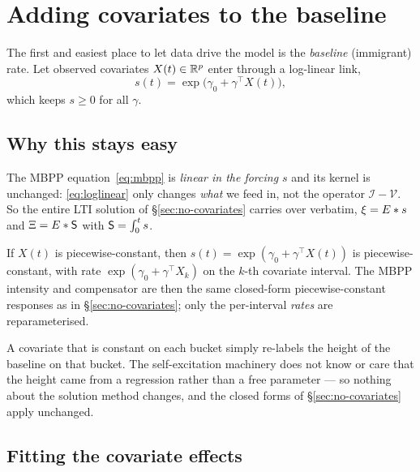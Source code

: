 \section{Adding covariates to the baseline}
\label{sec:baseline-cov}

The first and easiest place to let data drive the model is the \emph{baseline}
(immigrant) rate. Let observed covariates $X(t)\in\mathbb{R}^p$ enter through a log-linear
link,
\begin{equation}
s(t)=\exp\!\bigl(\gamma_0+\gamma^\top X(t)\bigr),
\label{eq:loglinear}
\end{equation}
which keeps $s\ge0$ for all $\gamma$.

\subsection{Why this stays easy}

The MBPP equation~\eqref{eq:mbpp} is \emph{linear in the forcing $s$} and its
kernel is unchanged: \eqref{eq:loglinear} only changes \emph{what} we feed in, not
the operator $\mathcal I-\mathcal V$. So the entire LTI solution of
\S\ref{sec:no-covariates} carries over verbatim, $\xi=E\ast s$ and
$\Xi=E\ast\mathsf{S}$ with $\mathsf{S}=\int_0^t s$.

\begin{proposition}
\label{prop:pc-cov}
If $X(t)$ is piecewise-constant, then $s(t)=\exp(\gamma_0+\gamma^\top X(t))$ is
piecewise-constant, with rate $\exp(\gamma_0+\gamma^\top X_k)$ on the $k$-th
covariate interval. The MBPP intensity and compensator are then the same
closed-form piecewise-constant responses as in \S\ref{sec:no-covariates}; only the
per-interval \emph{rates} are reparameterised.
\end{proposition}

\begin{intuition}
A covariate that is constant on each bucket simply re-labels the height of the
baseline on that bucket. The self-excitation machinery does not know or care that
the height came from a regression rather than a free parameter --- so nothing about
the solution method changes, and the closed forms of \S\ref{sec:no-covariates}
apply unchanged.
\end{intuition}

\subsection{Fitting the covariate effects}

